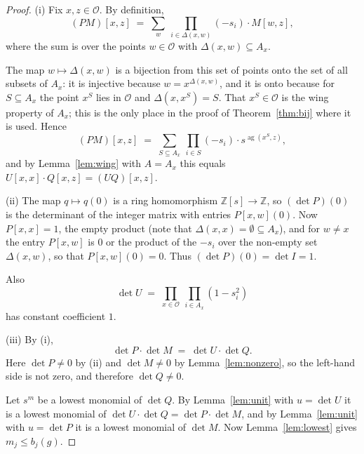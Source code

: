 \documentclass[11pt,reqno]{amsart}
\theoremstyle{definition}
\theoremstyle{remark}
\numberwithin{equation}{section}
\theoremstyle{named}
\theoremstyle{plain}
\newcommand{\Z}{\mathbb{Z}}
\newcommand{\ag}{\operatorname{ag}}
\newcommand{\cO}{\mathcal{O}}
\begin{document}
\begin{proof}
(i) Fix $x,z\in\cO$. By definition,
\[
   (PM)[x,z]\;=\;\sum_{w}\ \prod_{i\in\Delta(x,w)}(-s_i)\cdot M[w,z],
\]
where the sum is over the points
$w\in\cO$ with $\Delta(x,w)\subseteq A_x$.

The map $w\mapsto\Delta(x,w)$ is a bijection from this set
of points onto the set of all subsets of $A_x$: it is injective because $w=x^{\Delta(x,w)}$, and it
is onto because for $S\subseteq A_x$ the point $x^{S}$ lies in $\cO$ and $\Delta(x,x^{S})=S$. That
$x^{S}\in\cO$ is the wing property of $A_x$; this is the only place in the proof of
Theorem~\ref{thm:bij} where it is used. Hence
\[
   (PM)[x,z]\;=\;\sum_{S\subseteq A_x}\ \prod_{i\in S}(-s_i)\cdot s^{\ag(x^{S},z)},
\]
and by Lemma~\ref{lem:wing} with $A=A_x$ this equals $U[x,x]\cdot Q[x,z]=(UQ)[x,z]$.

(ii) The map $q\mapsto q(0)$ is a ring homomorphism $\Z[s]\to\Z$, so $(\det P)(0)$ is the
determinant of the integer matrix with entries $P[x,w](0)$. Now $P[x,x]=1$, the empty product (note
that $\Delta(x,x)=\emptyset\subseteq A_x$), and for $w\ne x$ the entry $P[x,w]$ is $0$ or the product
of the $-s_i$ over the non-empty set $\Delta(x,w)$, so that $P[x,w](0)=0$. Thus
$(\det P)(0)=\det I=1$.

Also
\[
   \det U\;=\;\prod_{x\in\cO}\ \prod_{i\in A_x}(1-s_i^{2})
\]
has constant
coefficient $1$.

(iii) By (i),
\[
   \det P\cdot\det M\;=\;\det U\cdot\det Q .
\]
Here $\det P\ne0$ by (ii) and $\det M\ne0$ by Lemma~\ref{lem:nonzero}, so the left-hand side is not
zero, and therefore $\det Q\ne0$.

Let $s^{m}$ be a lowest monomial of $\det Q$. By
Lemma~\ref{lem:unit} with $u=\det U$ it is a lowest monomial of $\det U\cdot\det Q=\det P\cdot\det M$,
and by Lemma~\ref{lem:unit} with $u=\det P$ it is a lowest monomial of $\det M$. Now
Lemma~\ref{lem:lowest} gives $m_j\le b_j(g)$.
\end{proof}
\end{document}
